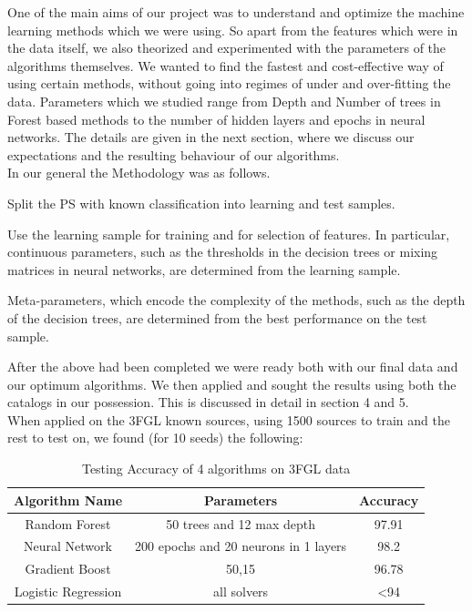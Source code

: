 One of the main aims of our project was to understand and optimize the machine learning methods which we were using. So apart from the features which were in the data itself, we also theorized and experimented with the parameters of the algorithms themselves. We wanted to find the fastest and cost-effective way of using certain methods, without going into regimes of under and over-fitting the data. Parameters which we studied range from Depth and Number of trees in Forest based methods to the number of hidden layers and epochs in neural networks. The details are given in the next section, where we discuss our expectations and the resulting behaviour of our algorithms.\\
  
In our general the Methodology was as follows.
\ben
\item
Split the PS with known classification into learning and test samples.
\item
Use the learning sample for training and for selection of features.
In particular, continuous parameters, such as the thresholds in the decision trees or mixing matrices in neural networks, are determined from the learning sample. 
\item
Meta-parameters, which encode the complexity of the methods, such as the depth of the decision trees,
are determined from the best performance on the test sample.
\een

After the above had been completed we were ready both with our final data and our optimum algorithms. We then applied and sought the results using both the catalogs in our possession. This is discussed in detail in section 4 and 5.\\


When applied on the 3FGL known sources, using 1500 sources to train and the rest to test on, we found (for 10 seeds) the following: \\

\begin{table}[!h]
    \tiny
    \centering
    \renewcommand{\tabcolsep}{1mm}
\renewcommand{\arraystretch}{1.5}

    \begin{tabular}{|c|c|c|}
    \hline
    Algorithm Name&Parameters & Accuracy\\
    \hline
    Random Forest& 50 trees and 12 max depth & 97.91        \\
    \hline
    Neural Network & 200 epochs and 20 neurons in 1 layers       &  98.2 \\
    \hline %
    Gradient Boost& 50,15      &   96.78  \\
    \hline %
    Logistic Regression& all solvers &<94  \\
    \hline
     
    \end{tabular}

    \caption{Testing Accuracy of 4 algorithms on 3FGL data}
    \label{tab:my_labe2l}
\end{table}

